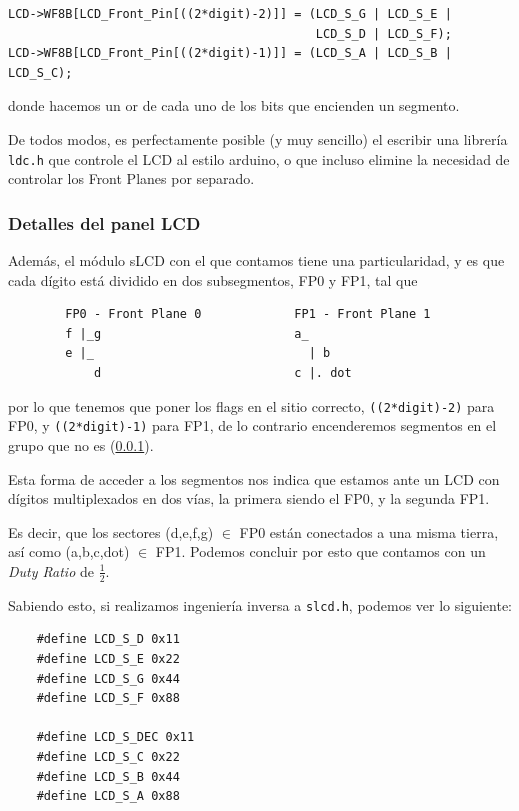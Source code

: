 \documentclass[a4paper,openright,12pt]{article}
\begin{document}
\begin{samepage}    
\begin{verbatim}
LCD->WF8B[LCD_Front_Pin[((2*digit)-2)]] = (LCD_S_G | LCD_S_E |
                                           LCD_S_D | LCD_S_F);
LCD->WF8B[LCD_Front_Pin[((2*digit)-1)]] = (LCD_S_A | LCD_S_B | LCD_S_C);
\end{verbatim}
\end{samepage}
donde hacemos un or de cada uno de los bits que encienden un segmento.

De todos modos, es perfectamente posible (y muy sencillo) el escribir una librería \texttt{ldc.h} que controle el LCD al estilo arduino, o que incluso elimine la necesidad de controlar
los Front Planes por separado.

\subsubsection{Detalles del panel LCD}\label{lcd_details}
Además, el módulo sLCD con el que contamos tiene una particularidad, y es que cada dígito está dividido en dos subsegmentos, FP0 y FP1, tal que

\begin{samepage}
\begin{verbatim}
        FP0 - Front Plane 0             FP1 - Front Plane 1
        f |_g                           a_
        e |_                              | b
            d                           c |. dot
\end{verbatim}
\end{samepage}
por lo que tenemos que poner los flags en el sitio correcto, \texttt{((2*digit)-2)} para FP0, y \texttt{((2*digit)-1)} para FP1, de lo contrario encenderemos segmentos en el grupo
que no es (\ref{lcd_details}).

Esta forma de acceder a los segmentos nos indica que estamos ante un LCD con dígitos multiplexados en dos vías, la primera siendo el FP0, y la segunda FP1. \autocite[430]{zhu2018embedded}

Es decir, que los sectores (d,e,f,g) $\in$ FP0 están conectados a una misma tierra, así como (a,b,c,dot) $\in$ FP1. Podemos concluir por esto que contamos con
un \emph{Duty Ratio} de $\frac{1}{2}$.

Sabiendo esto, si realizamos ingeniería inversa a \texttt{slcd.h}, podemos ver lo siguiente:
\begin{samepage}    
\begin{verbatim}
    #define LCD_S_D 0x11
    #define LCD_S_E 0x22
    #define LCD_S_G 0x44
    #define LCD_S_F 0x88

    #define LCD_S_DEC 0x11
    #define LCD_S_C 0x22
    #define LCD_S_B 0x44
    #define LCD_S_A 0x88
\end{verbatim}
\end{samepage}
\end{document}
